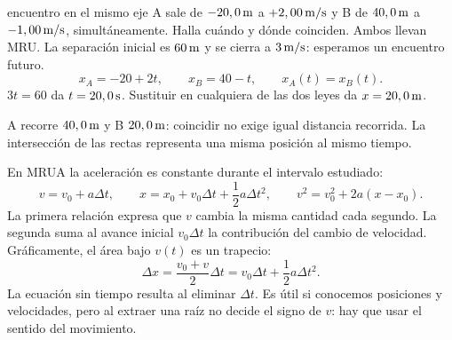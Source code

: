 \documentclass[11pt,a4paper]{article}
\begin{document}
\begin{examplebox}{encuentro en el mismo eje}
 A sale de $-20,0\,\mathrm{m}$ a $+2,00\,\mathrm{m/s}$ y B de
$40,0\,\mathrm{m}$ a $-1,00\,\mathrm{m/s}$, simult\'aneamente. Halla cu\'ando y d\'onde coinciden.
\solutionblock
{} Ambos llevan MRU. La separaci\'on inicial es $60\,\mathrm{m}$ y se
cierra a $3\,\mathrm{m/s}$: esperamos un encuentro futuro.
\[
x_A=-20+2t,\qquad x_B=40-t,\qquad x_A(t)=x_B(t).
\]
 $3t=60$ da $t=20,0\,\mathrm{s}$.
Sustituir en cualquiera de las dos leyes da $x=20,0\,\mathrm{m}$.
\begin{center}
\end{center}
 A recorre $40,0\,\mathrm{m}$ y B $20,0\,\mathrm{m}$:
coincidir no exige igual distancia recorrida. La intersecci\'on de las rectas
representa una misma posici\'on al mismo tiempo.
\end{examplebox}

En MRUA la aceleraci\'on es constante durante el intervalo estudiado:
\[
v=v_0+a\Delta t,\qquad
x=x_0+v_0\Delta t+\frac12a\Delta t^2,\qquad
v^2=v_0^2+2a(x-x_0).
\]
La primera relaci\'on expresa que $v$ cambia la misma cantidad cada segundo.
La segunda suma al avance inicial $v_0\Delta t$ la contribuci\'on del cambio
de velocidad. Gr\'aficamente, el \'area bajo $v(t)$ es un trapecio:
\[
\Delta x=\frac{v_0+v}{2}\Delta t
=v_0\Delta t+\frac12a\Delta t^2.
\]
La ecuaci\'on sin tiempo resulta al eliminar $\Delta t$.
Es \'util si conocemos posiciones y velocidades, pero al extraer una ra\'iz
no decide el signo de $v$: hay que usar el sentido del movimiento.
\end{document}
